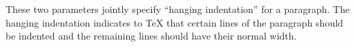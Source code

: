 \hangindent=5pc 
These two parameters jointly specify
``hanging indentation'' for a paragraph.
The hanging indentation indicates to \TeX{}
that certain lines of the paragraph should
be indented and the remaining lines should
have their normal width.
